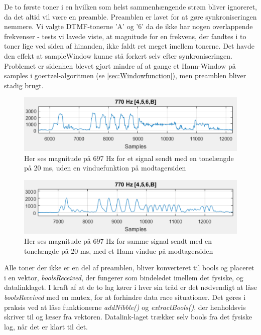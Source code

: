 De to første toner i en hvilken som helst sammenhængende strøm bliver ignoreret, da det altid vil være en preamble. Preamblen er lavet for at gøre synkroniseringen nemmere. Vi valgte DTMF-tonerne 'A' og '6' da de ikke har nogen overlappende frekvenser - tests vi lavede viste, at magnitude for en frekvens, der fandtes i to toner lige ved siden af hinanden, ikke faldt ret meget imellem tonerne. Det havde den effekt at sampleWindow kunne stå forkert selv efter synkroniseringen. Problemet er sidenhen blevet gjort mindre af at gange et Hann-Window på samples i goertzel-algoritmen (se \ref{sec:Windowfunction}), men preamblen bliver stadig brugt. 

\begin{figure}[h]
\centering
\includegraphics[scale=0.8]{Billeder/NoWindow.PNG}
\caption{Her ses magnitude på 697 Hz for et signal sendt med en tonelængde på 20 ms, uden en vinduefunktion på modtagersiden}
\label{fig:NoWindow}
\end{figure}

\begin{figure}[h]
\centering
\includegraphics[scale=0.8]{Billeder/HannWindow.PNG}
\caption{Her ses magnitude på 697 Hz for samme signal sendt med en tonelængde på 20 ms, med et Hann-vindue på modtagersiden}
\label{fig:NoWindow}
\end{figure}


Alle toner der ikke er en del af preamblen, bliver konverteret til bools og placeret i en vektor, \textit{boolsReceived}, der fungerer som bindeledet imellem det fysiske, og datalinklaget. I kraft af at de to lag kører i hver sin tråd er det nødvendigt at låse \textit{boolsReceived} med en mutex, for at forhindre data race situationer. Det gøres i praksis ved at låse funktionerne \textit{addNibble()} og \textit{extractBools()}, der henholdsvis skriver til og læser fra vektoren. Datalink-laget trækker selv bools fra det fysiske lag, når det er klart til det.\\

